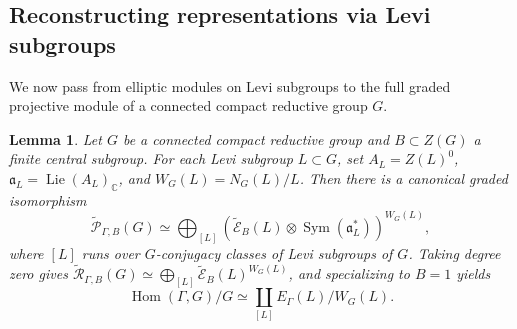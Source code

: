 \documentclass[11pt,a4paper,reqno]{amsart}
\theoremstyle{plain}
\newtheorem{lemma}[theorem]{Lemma}
\theoremstyle{definition}
\theoremstyle{remark}
\numberwithin{equation}{section}
\DeclareMathOperator{\Hom}{Hom}
\DeclareMathOperator{\Lie}{Lie}
\DeclareMathOperator{\Sym}{Sym}
\newcommand{\CC}{\mathbb C}
\newcommand{\fa}{\mathfrak a}
\newcommand{\wtE}{\widetilde{\mathcal E}}
\newcommand{\wtP}{\widetilde{\mathcal P}}
\newcommand{\wtR}{\widetilde{\mathcal R}}
\begin{document}
\subsection{Reconstructing representations via Levi subgroups}
We now pass from elliptic modules on Levi subgroups to the full graded projective module of a connected compact reductive group $G$.

\begin{lemma}\label{lem:levi}
Let $G$ be a connected compact reductive group and $B\subset Z(G)$ a finite central subgroup. For each Levi subgroup $L\subset G$, set $A_L=Z(L)^0$, $\fa_L=\Lie(A_L)_{\CC}$, and $W_G(L)=N_G(L)/L$. Then there is a canonical graded isomorphism
\begin{equation}\label{eq:levi-graded}
\wtP_{\Gamma,B}(G)\simeq\bigoplus_{[L]}\left(\wtE_B(L)\otimes\Sym(\fa_L^*)\right)^{W_G(L)},
\end{equation}
where $[L]$ runs over $G$-conjugacy classes of Levi subgroups of $G$. Taking degree zero gives $\wtR_{\Gamma,B}(G)\simeq\bigoplus_{[L]}\wtE_B(L)^{W_G(L)}$, and specializing to $B=1$ yields
\begin{equation}\label{eq:levi-classes}
\Hom(\Gamma,G)/G\simeq\coprod_{[L]}E_\Gamma(L)/W_G(L).
\end{equation}
\end{lemma}
\end{document}
